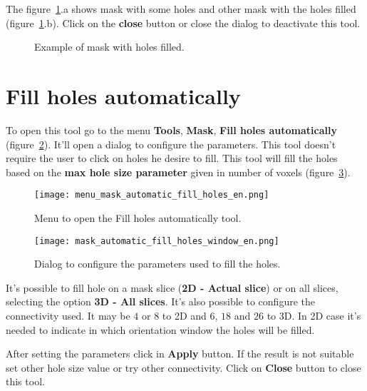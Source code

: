 The figure~\ref{fig:mask_fill_hole}.a shows mask with some holes and other mask with the holes filled (figure~\ref{fig:mask_fill_hole}.b). Click on the \textbf{close} button or close the dialog to deactivate this tool.

\begin{figure}[!htb]
  \centering
    \qquad
  \hfill
  \caption{Example of mask with holes filled.}
  \label{fig:mask_fill_hole}
\end{figure}


\section{Fill holes automatically}

To open this tool go to the menu \textbf{Tools}, \textbf{Mask}, \textbf{Fill holes automatically} (figure~\ref{fig:menu_mask_automatic_fill_holes}). It'll open a dialog to configure the parameters. This tool doesn't require the user to click on holes he desire to fill. This tool will fill the holes based on the \textbf{max hole size parameter} given in number of voxels (figure~\ref{fig:mask_automatic_fill_holes_window}).

\begin{figure}[!htb]
\centering
\texttt{[image: menu\_mask\_automatic\_fill\_holes\_en.png]}
\caption{Menu to open the Fill holes automatically tool.}
\label{fig:menu_mask_automatic_fill_holes}
\end{figure}

\begin{figure}[!htb]
\centering
\texttt{[image: mask\_automatic\_fill\_holes\_window\_en.png]}
\caption{Dialog to configure the parameters used to fill the holes.}
\label{fig:mask_automatic_fill_holes_window}
\end{figure}

It's possible to fill hole on a mask slice (\textbf{2D - Actual slice}) or on all slices, selecting the option \textbf{3D - All slices}. It's also possible to configure the connectivity used. It may be $4$ or $8$ to 2D and $6$, $18$ and $26$ to 3D. In 2D case it's needed to indicate in which orientation window the holes will be filled.

After setting the parameters click in \textbf{Apply} button. If the result is not suitable set other hole size value or try other connectivity. Click on \textbf{Close} button to close this tool.

